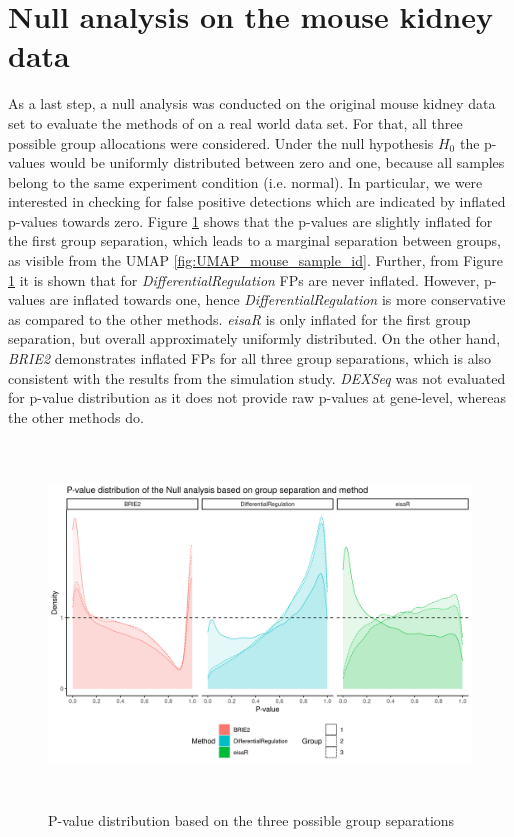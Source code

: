 \section{Null analysis on the mouse kidney data}
As a last step, a null analysis was conducted on the original mouse kidney data set to evaluate the methods of on a real world data set. For that, all three possible group allocations were considered. Under the null hypothesis $H_0$ the p-values would be uniformly distributed between zero and one, because all samples belong to the same experiment condition (i.e. normal). In particular, we were interested in checking for false positive detections which are indicated by inflated p-values towards zero. Figure \ref{fig:null_p_values} shows that the p-values are slightly inflated for the first group separation, which leads to a marginal separation between groups, as visible from the UMAP \ref{fig:UMAP_mouse_sample_id}. Further, from Figure \ref{fig:null_p_values} it is shown that for \emph{DifferentialRegulation} FPs are never inflated. However, p-values are inflated towards one, hence \emph{DifferentialRegulation} is more conservative as compared to the other methods. \emph{eisaR} is only inflated for the first group separation, but overall approximately uniformly distributed. On the other hand, \emph{BRIE2} demonstrates inflated FPs for all three group separations, which is also consistent with the results from the simulation study. \emph{DEXSeq} was not evaluated for p-value distribution as it does not provide raw p-values at gene-level, whereas the other methods do.

\begin{figure}[!htb]
\begin{center}
\includegraphics[width=6in,height=3.8in]{../figures/null_analysis/p_value_distribution.png}
\end{center}
\caption{P-value distribution based on the three possible group separations}
\label{fig:null_p_values}
\end{figure}


